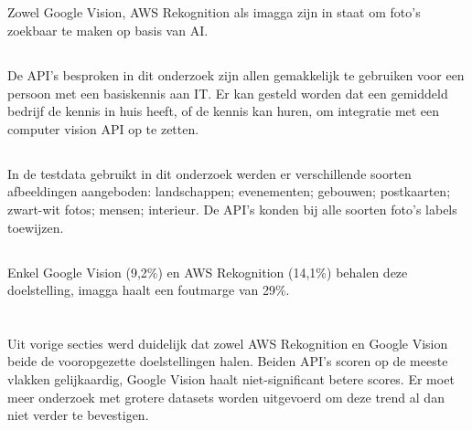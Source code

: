 \subsection{}
\label{sec:resultaten-doelstelling1}
Zowel Google Vision, AWS Rekognition als imagga zijn in staat om foto's zoekbaar te maken op basis van AI.

\subsection{}
\label{sec:resultaten-doelstelling2}
De API's besproken in dit onderzoek zijn allen gemakkelijk te gebruiken voor een persoon met een basiskennis aan IT. Er kan gesteld worden dat een gemiddeld bedrijf de kennis in huis heeft, of de kennis kan huren, om integratie met een computer vision API op te zetten.

\subsection{}
\label{sec:resultaten-doelstelling3}
In de testdata gebruikt in dit onderzoek werden er verschillende soorten afbeeldingen aangeboden: landschappen; evenementen; gebouwen; postkaarten; zwart-wit fotos; mensen; interieur. De API's konden bij alle soorten foto's labels toewijzen.

\subsection{}
\label{sec:resultaten-doelstelling4}
Enkel Google Vision (9,2\%) en AWS Rekognition (14,1\%) behalen deze doelstelling, imagga haalt een foutmarge van 29\%. 

\section{}
\label{sec:resultaten-besluit}
Uit vorige secties werd duidelijk dat zowel AWS Rekognition en Google Vision beide de vooropgezette doelstellingen halen. Beiden API's scoren op de meeste vlakken gelijkaardig, Google Vision haalt niet-significant betere scores. Er moet meer onderzoek met grotere datasets worden uitgevoerd om deze trend al dan niet verder te bevestigen.

